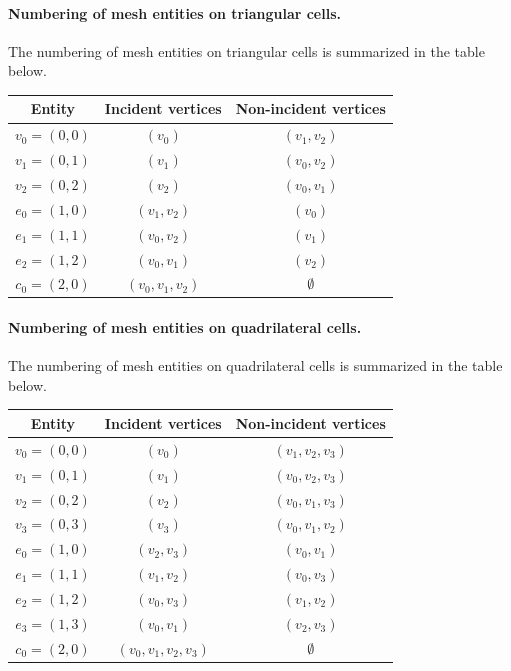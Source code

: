 \paragraph{Numbering of mesh entities on triangular cells.}

The numbering of mesh entities on triangular cells is summarized in the
table below.

\begin{center}
  \begin{tabular}{ccc}
    \toprule
    Entity & Incident vertices & Non-incident vertices \\
    \hline
    $v_0 = (0, 0)$ & $(v_0)$ & $(v_1, v_2)$ \\
    $v_1 = (0, 1)$ & $(v_1)$ & $(v_0, v_2)$ \\
    $v_2 = (0, 2)$ & $(v_2)$ & $(v_0, v_1)$ \\
    $e_0 = (1, 0)$ & $(v_1, v_2)$ & $(v_0)$ \\
    $e_1 = (1, 1)$ & $(v_0, v_2)$ & $(v_1)$ \\
    $e_2 = (1, 2)$ & $(v_0, v_1)$ & $(v_2)$ \\
    $c_0 = (2, 0)$ & $(v_0, v_1, v_2)$ & $\emptyset$ \\
    \bottomrule
  \end{tabular}
\end{center}

\paragraph{Numbering of mesh entities on quadrilateral cells.}

The numbering of mesh entities on quadrilateral cells is summarized in the
table below.

\begin{center}
  \begin{tabular}{ccc}
    \toprule
    Entity & Incident vertices & Non-incident vertices \\
    \hline
    $v_0 = (0, 0)$ & $(v_0)$ & $(v_1, v_2, v_3)$ \\
    $v_1 = (0, 1)$ & $(v_1)$ & $(v_0, v_2, v_3)$ \\
    $v_2 = (0, 2)$ & $(v_2)$ & $(v_0, v_1, v_3)$ \\
    $v_3 = (0, 3)$ & $(v_3)$ & $(v_0, v_1, v_2)$ \\
    $e_0 = (1, 0)$ & $(v_2, v_3)$ & $(v_0, v_1)$ \\
    $e_1 = (1, 1)$ & $(v_1, v_2)$ & $(v_0, v_3)$ \\
    $e_2 = (1, 2)$ & $(v_0, v_3)$ & $(v_1, v_2)$ \\
    $e_3 = (1, 3)$ & $(v_0, v_1)$ & $(v_2, v_3)$ \\
    $c_0 = (2, 0)$ & $(v_0, v_1, v_2, v_3)$ & $\emptyset$ \\
    \bottomrule
  \end{tabular}
\end{center}

